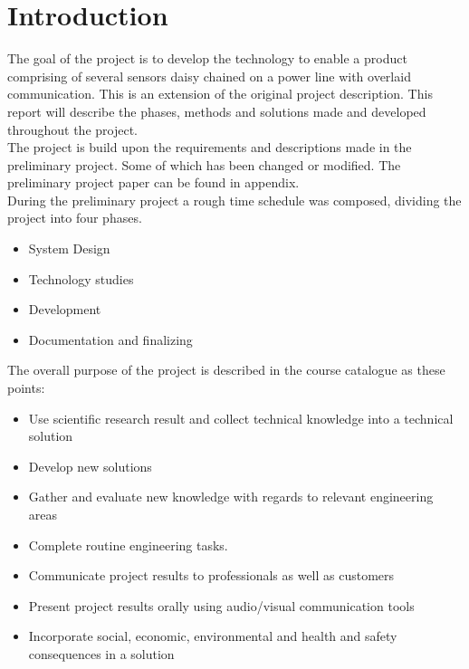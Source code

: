 \chapter{Introduction}

The goal of the project is to develop the technology to enable a product comprising of several sensors daisy chained on a power line with overlaid communication. This is an extension of the original project description. This report will describe the phases, methods and solutions made and developed throughout the project.\\

The project is build upon the requirements and descriptions made in the preliminary project. Some of which has been changed or modified. The preliminary project paper can be found in appendix.\\

During the preliminary project a rough time schedule was composed, dividing the project into four phases.

\begin{itemize}
	\item System Design
	\item Technology studies
	\item Development
	\item Documentation and finalizing
\end{itemize}

The overall purpose of the project is described in the course catalogue as these points:

\begin{itemize}
	\item Use scientific research result and collect technical knowledge into a technical solution
	\item Develop new solutions
	\item Gather and evaluate new knowledge with regards to relevant engineering areas
	\item Complete routine engineering tasks.
	\item Communicate project results to professionals as well as customers
	\item Present project results orally using audio/visual communication tools
	\item Incorporate social, economic, environmental and health and safety consequences in a solution	
\end{itemize}


